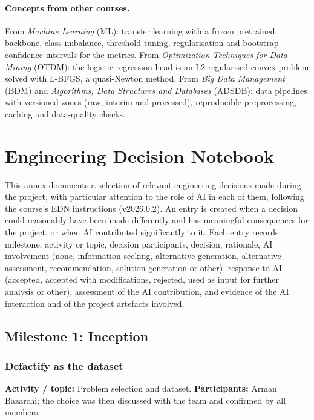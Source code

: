 \documentclass[11pt]{article}
\begin{document}
\paragraph{Concepts from other courses.} From \emph{Machine Learning} (ML): transfer learning with a frozen pretrained backbone, class imbalance, threshold tuning, regularisation and bootstrap confidence intervals for the metrics. From \emph{Optimization Techniques for Data Mining} (OTDM): the logistic-regression head is an L2-regularised convex problem solved with L-BFGS, a quasi-Newton method. From \emph{Big Data Management} (BDM) and \emph{Algorithms, Data Structures and Databases} (ADSDB): data pipelines with versioned zones (raw, interim and processed), reproducible preprocessing, caching and data-quality checks.

\clearpage
{}  %
\appendix
\section{Engineering Decision Notebook}
\label{app:edn}

This annex documents a selection of relevant engineering decisions made during the project, with particular attention to the role of AI in each of them, following the course's EDN instructions (v2026.0.2). An entry is created when a decision could reasonably have been made differently and has meaningful consequences for the project, or when AI contributed significantly to it. Each entry records: milestone, activity or topic, decision participants, decision, rationale, AI involvement (none, information seeking, alternative generation, alternative assessment, recommendation, solution generation or other), response to AI (accepted, accepted with modifications, rejected, used as input for further analysis or other), assessment of the AI contribution, and evidence of the AI interaction and of the project artefacts involved.

\subsection{Milestone 1: Inception}

\subsubsection{Defactify as the dataset}
\noindent\textbf{Activity / topic:} Problem selection and dataset. \textbf{Participants:} Arman Bazarchi; the choice was then discussed with the team and confirmed by all members.
\end{document}
